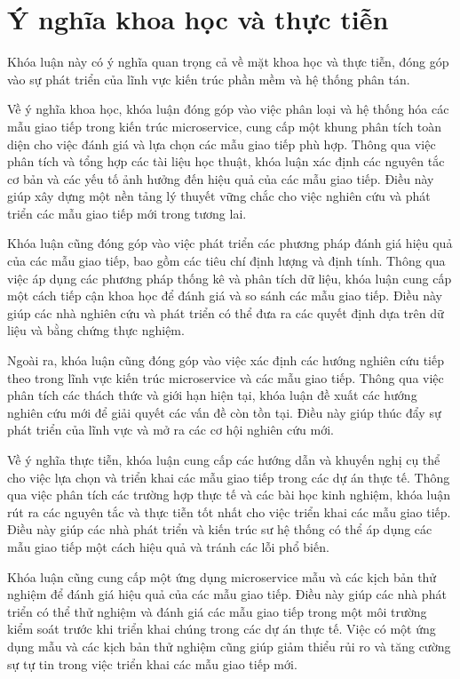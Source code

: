 \section{Ý nghĩa khoa học và thực tiễn}
Khóa luận này có ý nghĩa quan trọng cả về mặt khoa học và thực tiễn, đóng góp vào sự phát triển của lĩnh vực kiến trúc phần mềm và hệ thống phân tán.

Về ý nghĩa khoa học, khóa luận đóng góp vào việc phân loại và hệ thống hóa các mẫu giao tiếp trong kiến trúc microservice, cung cấp một khung phân tích toàn diện cho việc đánh giá và lựa chọn các mẫu giao tiếp phù hợp. Thông qua việc phân tích và tổng hợp các tài liệu học thuật, khóa luận xác định các nguyên tắc cơ bản và các yếu tố ảnh hưởng đến hiệu quả của các mẫu giao tiếp. Điều này giúp xây dựng một nền tảng lý thuyết vững chắc cho việc nghiên cứu và phát triển các mẫu giao tiếp mới trong tương lai.

Khóa luận cũng đóng góp vào việc phát triển các phương pháp đánh giá hiệu quả của các mẫu giao tiếp, bao gồm các tiêu chí định lượng và định tính. Thông qua việc áp dụng các phương pháp thống kê và phân tích dữ liệu, khóa luận cung cấp một cách tiếp cận khoa học để đánh giá và so sánh các mẫu giao tiếp. Điều này giúp các nhà nghiên cứu và phát triển có thể đưa ra các quyết định dựa trên dữ liệu và bằng chứng thực nghiệm.

Ngoài ra, khóa luận cũng đóng góp vào việc xác định các hướng nghiên cứu tiếp theo trong lĩnh vực kiến trúc microservice và các mẫu giao tiếp. Thông qua việc phân tích các thách thức và giới hạn hiện tại, khóa luận đề xuất các hướng nghiên cứu mới để giải quyết các vấn đề còn tồn tại. Điều này giúp thúc đẩy sự phát triển của lĩnh vực và mở ra các cơ hội nghiên cứu mới.

Về ý nghĩa thực tiễn, khóa luận cung cấp các hướng dẫn và khuyến nghị cụ thể cho việc lựa chọn và triển khai các mẫu giao tiếp trong các dự án thực tế. Thông qua việc phân tích các trường hợp thực tế và các bài học kinh nghiệm, khóa luận rút ra các nguyên tắc và thực tiễn tốt nhất cho việc triển khai các mẫu giao tiếp. Điều này giúp các nhà phát triển và kiến trúc sư hệ thống có thể áp dụng các mẫu giao tiếp một cách hiệu quả và tránh các lỗi phổ biến.

Khóa luận cũng cung cấp một ứng dụng microservice mẫu và các kịch bản thử nghiệm để đánh giá hiệu quả của các mẫu giao tiếp. Điều này giúp các nhà phát triển có thể thử nghiệm và đánh giá các mẫu giao tiếp trong một môi trường kiểm soát trước khi triển khai chúng trong các dự án thực tế. Việc có một ứng dụng mẫu và các kịch bản thử nghiệm cũng giúp giảm thiểu rủi ro và tăng cường sự tự tin trong việc triển khai các mẫu giao tiếp mới.

